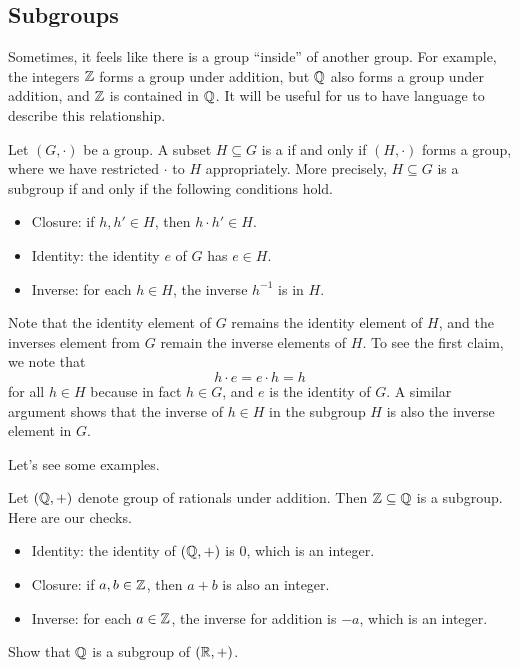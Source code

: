 \documentclass[../main.tex]{subfiles}
\begin{document}
\subsection{Subgroups}
Sometimes, it feels like there is a group ``inside'' of another group. For example, the integers $\mathbb Z$ forms a group under addition, but $\mathbb Q$ also forms a group under addition, and $\mathbb Z$ is contained in $\mathbb Q$. It will be useful for us to have language to describe this relationship.
\begin{definition}[subgroup]
    Let $(G,\cdot)$ be a group. A subset $H\subseteq G$ is a  if and only if $(H,\cdot)$ forms a group, where we have restricted $\cdot$ to $H$ appropriately. More precisely, $H\subseteq G$ is a subgroup if and only if the following conditions hold.
    \begin{itemize}
        \item Closure: if $h,h'\in H$, then $h\cdot h'\in H$.
        \item Identity: the identity $e$ of $G$ has $e\in H$.
        \item Inverse: for each $h\in H$, the inverse $h^{-1}$ is in $H$.
    \end{itemize}
\end{definition}
\begin{remark}
    Note that the identity element of $G$ remains the identity element of $H$, and the inverses element from $G$ remain the inverse elements of $H$. To see the first claim, we note that
    \[h\cdot e=e\cdot h=h\]
    for all $h\in H$ because in fact $h\in G$, and $e$ is the identity of $G$. A similar argument shows that the inverse of $h\in H$ in the subgroup $H$ is also the inverse element in $G$.
\end{remark}
Let's see some examples.
\begin{example}
    Let $(\mathbb Q,+)$ denote group of rationals under addition. Then $\mathbb Z\subseteq\mathbb Q$ is a subgroup. Here are our checks.
    \begin{itemize}
        \item Identity: the identity of $(\mathbb Q,+)$ is $0$, which is an integer.
        \item Closure: if $a,b\in\mathbb Z$, then $a+b$ is also an integer.
        \item Inverse: for each $a\in\mathbb Z$, the inverse for addition is $-a$, which is an integer.
    \end{itemize}
\end{example}
\begin{exe}
    Show that $\mathbb Q$ is a subgroup of $(\mathbb R,+)$.
\end{exe}
\end{document}
